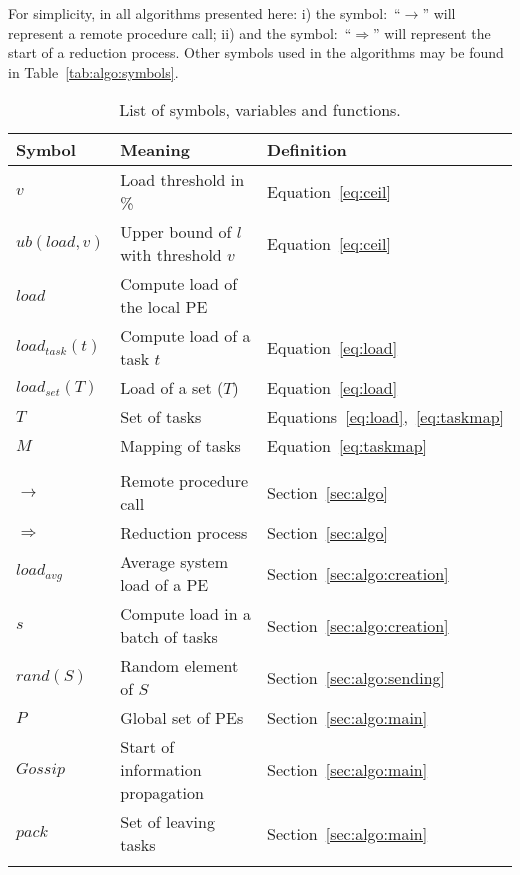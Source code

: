 For simplicity, in all algorithms presented here: i) the symbol:~``$\rightarrow$'' will represent a remote procedure call; ii) and the symbol:~``$\Rightarrow$'' will  represent the start of a reduction process.
Other symbols used in the algorithms may be found in Table~\ref{tab:algo:symbols}.


\begin{table}[t]
	\caption{List of symbols, variables and functions.}
	\begin{tabular}{l | l | l }
		Symbol & Meaning & Definition\\ \hline
		
		$v$				& Load threshold in \% 								& Equation~\ref{eq:ceil} \\
		$ub(load,v)$		& Upper bound of $l$ with threshold $v$		 		& Equation~\ref{eq:ceil} \\
		$load$			& Compute load of the local PE \\
		$load_{task}(t)$	& Compute load of a task $t$							& Equation~\ref{eq:load}	\\
		$load_{set}(T)$	& Load of a set ($T$) 								& Equation~\ref{eq:load} \\
		$T$				& Set of tasks 										& Equations~\ref{eq:load},~\ref{eq:taskmap} \\		
		$M$				& Mapping of tasks									& Equation~\ref{eq:taskmap} \\
		& &\\	

		$\rightarrow$ 	& Remote procedure call 								& Section~\ref{sec:algo} \\
		$\Rightarrow$ 	& Reduction process 									& Section~\ref{sec:algo} \\
		$load_{avg}$		& Average system load of a PE 						& Section~\ref{sec:algo:creation}\\ 
		$s$			  	& Compute load in a batch of tasks 					& Section~\ref{sec:algo:creation} \\
		$rand(S)$		& Random element of $S$ 								& Section~\ref{sec:algo:sending} \\
		$P$				& Global set of PEs 									& Section~\ref{sec:algo:main} \\
		$Gossip$			& Start of information propagation					& Section~\ref{sec:algo:main} \\		
		$pack$			& Set of leaving tasks								& Section~\ref{sec:algo:main} \\
		& &\\
				

\end{tabular}
\end{table}
